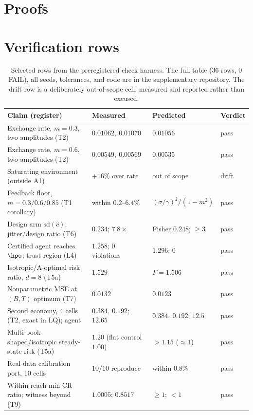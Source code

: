 \documentclass{article}
\begin{document}
\section{Proofs}
\label{app:proofs}


\clearpage
\section{Verification rows}
\label{app:table}

\begin{table}[H]
\centering
\small
\setlength{\tabcolsep}{4pt}
\caption{Selected rows from the preregistered check harness. The full table
(36 rows, 0 FAIL), all seeds, tolerances, and code are in the supplementary
repository. The drift row is a deliberately out-of-scope cell, measured and
reported rather than excused.}
\label{tab:results}
\begin{tabular}{@{}llll@{}}
\toprule
Claim (register) & Measured & Predicted & Verdict \\
\midrule
Exchange rate, $m{=}0.3$, two amplitudes (T2) & $0.01062,\ 0.01070$ & $0.01056$ & pass \\
Exchange rate, $m{=}0.6$, two amplitudes (T2) & $0.00549,\ 0.00569$ & $0.00535$ & pass \\
Saturating environment (outside A1) & $+16\%$ over rate & out of scope & drift \\
Feedback floor, $m{=}0.3/0.6/0.85$ (T1 corollary) & within $0.2$--$6.4\%$ & $(\sigma/\gamma)^2/(1{-}m^2)$ & pass \\
Design arm $\mathrm{sd}(\hat c)$; jitter/design ratio (T6) & $0.234$; $7.8\times$ & Fisher $0.248$; $\ge 3$ & pass \\
Certified agent reaches $\hpo$; trust region (L4) & $1.258$; $0$ violations & $1.296$; $0$ & pass \\
Isotropic/A-optimal risk ratio, $d{=}8$ (T5a) & $1.529$ & $F = 1.506$ & pass \\
Nonparametric MSE at $(B,T)$ optimum (T7) & $0.0132$ & $0.0123$ & pass \\
Second economy, 4 cells (T2, exact in LQ); agent & $0.384,\ 0.192$; $12.65$ & $0.384,\ 0.192$; $12.5$ & pass \\
Multi-book shaped/isotropic steady-state risk (T5a) & $1.20$ (flat control $1.00$) & $>1.15$ ($\approx 1$) & pass \\
Real-data calibration port, 10 cells & $10/10$ reproduce & within $0.8\%$ & pass \\
Within-reach min CR ratio; witness beyond (T9) & $1.0005$; $0.8517$ & $\ge 1$; $< 1$ & pass \\
\bottomrule
\end{tabular}
\end{table}
\end{document}
